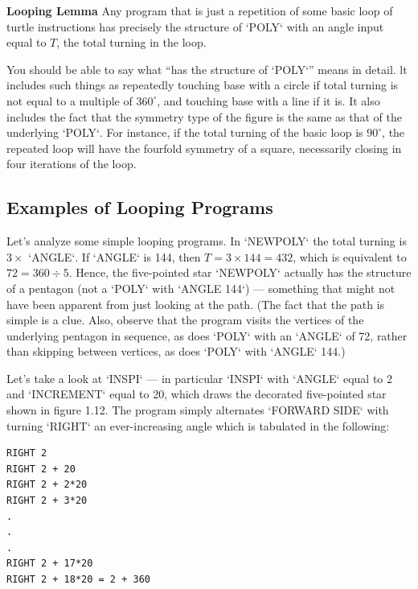 \documentclass{book}
\begin{document}
\vspace{0.5cm}

\noindent \textbf{Looping Lemma} Any program that is just a repetition of some basic
loop of turtle instructions has precisely the structure of \textsc{`POLY`} with an
angle input equal to $T$, the total turning in the loop.

\vspace{0.5cm}

You should be able to say what ``has the structure of \textsc{`POLY`}'' means in
detail. lt includes such things as repeatedly touching base with a circle
if total turning is not equal to a multiple of $360^{\circ}$, and touching base
with a line if it is. It also includes the fact that the symmetry type of
the figure is the same as that of the underlying \textsc{`POLY`}. For instance, if
the total turning of the basic loop is $90^{\circ}$, the repeated loop will have the
fourfold symmetry of a square, necessarily closing in four iterations of
the loop.

\subsection{Examples of Looping Programs}

Let's analyze some simple looping programs. In \textsc{`NEWPOLY`} the total
turning is $3 \times$ \textsc{`ANGLE`}. If \textsc{`ANGLE`} is 144, then $T = 3 \times 144 = 432$, which is
equivalent to $72 = 360 \div 5$. Hence, the five-pointed star \textsc{`NEWPOLY`} actually
has the structure of a pentagon (not a \textsc{`POLY`} with \textsc{`ANGLE 144`}) --- something
that might not have been apparent from just looking at the path. (The
fact that the path is simple is a clue. Also, observe that the program
visits the vertices of the underlying pentagon in sequence, as does \textsc{`POLY`}
with an \textsc{`ANGLE`} of 72, rather than skipping between vertices, as does \textsc{`POLY`}
with \textsc{`ANGLE`} 144.)

\indent
Let's take a look at \textsc{`INSPI`} --- in particular \textsc{`INSPI`} with \textsc{`ANGLE`} equal to
2 and \textsc{`INCREMENT`} equal to 20, which draws the decorated five-pointed
star shown in figure 1.12. The program simply alternates \textsc{`FORWARD SIDE`}
with turning \textsc{`RIGHT`} an ever-increasing angle which is tabulated in the
following:

\begin{verbatim}
RIGHT 2
RIGHT 2 + 20
RIGHT 2 + 2*20
RIGHT 2 + 3*20
.
.
.
RIGHT 2 + 17*20
RIGHT 2 + 18*20 = 2 + 360
\end{verbatim}
\end{document}
